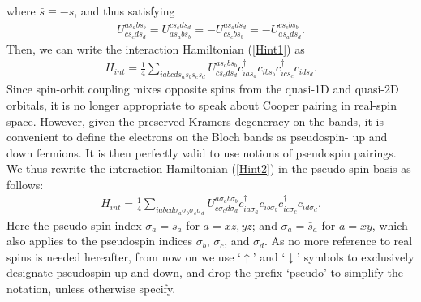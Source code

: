 \documentclass[aps,prl,twocolumn,superscriptaddress,showpacs]{revtex4-1}
\newcommand{\ua}{\uparrow}
\newcommand{\da}{\downarrow}
\begin{document}
where $\bar{s}\equiv-s$, and thus satisfying
\begin{align}\label{Usym}
U^{as_abs_b}_{cs_cds_d}=U^{cs_cds_d}_{as_abs_b}
=-U^{as_ads_d}_{cs_c bs_b}=-U^{cs_c bs_b}_{as_ads_d}.
\end{align}
Then, we can write the interaction Hamiltonian (\ref{Hint1}) as
\begin{align}\label{Hint2}
H_{int}=\frac{1}{4}\sum_{iabcds_as_bs_cs_d}
U^{as_abs_b}_{cs_cds_d}
c^{\dagger}_{ias_a}c_{ibs_b}
c^{\dagger}_{ics_c}c_{ids_d}.
\end{align}
Since spin-orbit coupling mixes opposite spins from the quasi-1D and quasi-2D orbitals, it is no longer appropriate to speak about Cooper pairing in real-spin space. However, given the preserved Kramers degeneracy on the bands, it is convenient to define the electrons on the Bloch bands as pseudospin- up and down fermions. It is then perfectly valid to use notions of pseudospin pairings. We thus rewrite the interaction Hamiltonian (\ref{Hint2}) in the pseudo-spin basis as follows:
\begin{align}\label{Hint3}
H_{int}=\frac{1}{4}\sum_{iabcd\sigma_a\sigma_b\sigma_c\sigma_d}
U^{a\sigma_ab\sigma_b}_{c\sigma_cd\sigma_d}
c^{\dagger}_{ia\sigma_a}c_{ib\sigma_b}
c^{\dagger}_{ic\sigma_c}c_{id\sigma_d}.
\end{align}
Here the pseudo-spin index $\sigma_a=s_a$ for $a=xz,yz$; and $\sigma_a=\bar{s}_a$ for $a=xy$, which also applies to the pseudospin indices $\sigma_b$, $\sigma_c$, and $\sigma_d$. As no more reference to real spins is needed hereafter, from now on we use `$\ua$' and `$\da$' symbols to exclusively designate pseudospin up and down, and drop the prefix `pseudo' to simplify the notation, unless otherwise specify.
\end{document}
